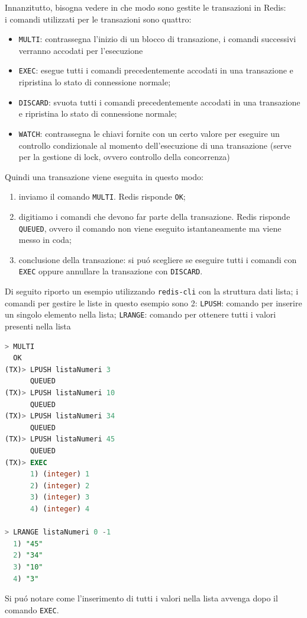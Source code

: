 Innanzitutto, bisogna vedere in che modo sono gestite le transazioni in Redis:\\
i comandi utilizzati per le transazioni sono quattro:
\begin{itemize}
    \item \texttt{MULTI}: contrassegna l'inizio di un blocco di transazione, i comandi successivi verranno accodati per l'esecuzione
    \item \texttt{EXEC}: esegue tutti i comandi precedentemente accodati in una transazione e ripristina lo stato di connessione normale;
    \item \texttt{DISCARD}: svuota tutti i comandi precedentemente accodati in una transazione e ripristina lo stato di connessione normale;
    \item \texttt{WATCH}: contrassegna le chiavi fornite con un certo valore per eseguire un controllo condizionale al momento dell'esecuzione
    di una transazione (serve per la gestione di lock, ovvero controllo della concorrenza)
\end{itemize}

Quindi una transazione viene eseguita in questo modo:
\begin{enumerate}
    \item inviamo il comando \texttt{MULTI}. Redis risponde \texttt{OK};
    \item digitiamo i comandi che devono far parte della transazione. Redis risponde \texttt{QUEUED}, ovvero il comando non viene eseguito
    istantaneamente ma viene messo in coda;
    \item conclusione della transazione: si puó scegliere se eseguire tutti i comandi con \texttt{EXEC} oppure annullare la transazione
    con \texttt{DISCARD}.
\end{enumerate}

Di seguito riporto un esempio utilizzando \texttt{redis-cli} con la struttura dati lista; i comandi per gestire le liste in questo esempio
sono 2: \texttt{LPUSH}: comando per inserire un singolo elemento nella lista; \texttt{LRANGE}: comando per ottenere tutti i valori presenti nella lista

\begin{lstlisting}[autogobble, style=redis-cli, language=SQL]
> MULTI
  OK
(TX)> LPUSH listaNumeri 3
      QUEUED
(TX)> LPUSH listaNumeri 10
      QUEUED
(TX)> LPUSH listaNumeri 34
      QUEUED
(TX)> LPUSH listaNumeri 45
      QUEUED
(TX)> EXEC
      1) (integer) 1
      2) (integer) 2
      3) (integer) 3
      4) (integer) 4

> LRANGE listaNumeri 0 -1
  1) "45"
  2) "34"
  3) "10"
  4) "3"\end{lstlisting}
Si puó notare come l'inserimento di tutti i valori nella lista avvenga dopo il comando \texttt{EXEC}.\\
